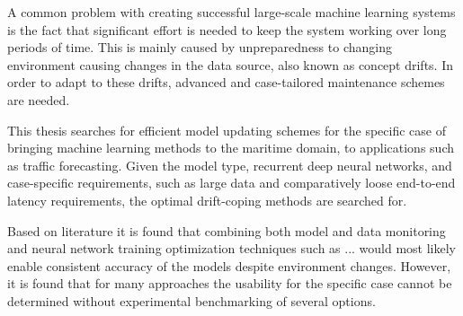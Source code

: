 
A common problem with creating successful large-scale machine learning systems is the fact that significant effort is needed to keep the system working over long periods of time. This is mainly caused by unpreparedness to changing environment causing changes in the data source, also known as concept drifts. In order to adapt to these drifts, advanced and case-tailored maintenance schemes are needed.

This thesis searches for efficient model updating schemes for the specific case of bringing machine learning methods to the maritime domain, to applications such as traffic forecasting. Given the model type, recurrent deep neural networks, and case-specific requirements, such as large data and comparatively loose end-to-end latency requirements, the optimal drift-coping methods are searched for.

Based on literature it is found that combining both model and data monitoring and neural network training optimization techniques such as ... would most likely enable consistent accuracy of the models despite environment changes. However, it is found that for many approaches the usability for the specific case cannot be determined without experimental benchmarking of several options.  %

  
